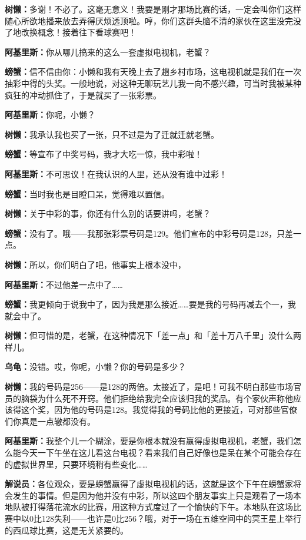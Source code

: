 \documentclass[
  12pt,
  twoside,
  openright,
  oldfontcommands,
]{memoir}
\newcommand{\dialogname}[1]{{\heifamily\bfseries #1}}
\begin{document}
\dialogname{树懒：}多谢！不必了。这毫无意义！我要是刚才那场比赛的话，一定会叫你们这样随心所欲地播来放去弄得厌烦透顶啦。哼，你们这群头脑不清的家伙在这里没完没了地改换概念！接着往下看球赛吧！

\dialogname{阿基里斯：}你从哪儿搞来的这么一套虚拟电视机，老蟹？

\dialogname{螃蟹：}信不信由你：小懒和我有天晚上去了趟乡村市场，这电视机就是我们在一次抽彩中得的头奖。一般地说，对这种无聊玩艺儿我一向不感兴趣，可当时我被某种疯狂的冲动抓住了，于是就买了一张彩票。

\dialogname{阿基里斯：}你呢，小懒？

\dialogname{树懒：}我承认我也买了一张，只不过是为了迁就迁就老蟹。

\dialogname{螃蟹：}等宣布了中奖号码，我才大吃一惊，我中彩啦！

\dialogname{阿基里斯：}不可思议！在我认识的人里，还从没有谁中过彩！

\dialogname{螃蟹：}当时我也是目瞪口呆，觉得难以置信。

\dialogname{树懒：}关于中彩的事，你还有什么别的话要讲吗，老蟹？

\dialogname{螃蟹：}没有了。哦------我那张彩票号码是129。他们宣布的中彩号码是128，只差一点。

\dialogname{树懒：}所以，你们明白了吧，他事实上根本没中，

\dialogname{阿基里斯：}不过他差一点中了\ldots\ldots{}

\dialogname{螃蟹：}我更倾向于说我中了，因为我是那么接近\ldots\ldots 要是我的号码再减去个一，我就会中了。

\dialogname{树懒：}但可惜的是，老蟹，在这种情况下「差一点」和「差十万八千里」没什么两样儿。

\dialogname{乌龟：}没错。哎，你呢，小懒？你的号码是多少？

\dialogname{树懒：}我的号码是256------是128的两倍。太接近了，是吧！可我不明白那些市场官员的脑袋为什么死不开窍。他们拒绝给我完全应该归我的奖品。有个家伙声称他应该得这个奖，因为他的号码是128。我觉得我的号码比他的更接近，可对那些官僚们你真是一点辙都没有。

\dialogname{阿基里斯：}我整个儿一个糊涂，要是你根本就没有赢得虚拟电视机，老蟹，我们怎么能今天一下午坐在这儿看这台电视？看来我们自己好像也是呆在某个可能会存在的虚拟世界里，只要环境稍有些变化\ldots\ldots{}

\dialogname{解说员：}各位观众，要是螃蟹赢得了虚拟电视机的话，这就是这个下午在螃蟹家将会发生的事情。但是因为他并没有中彩，所以这四个朋友事实上只是观看了一场本地队被打得落花流水的比赛，用这种方式度过了一个愉快的下午。本地队在这场比赛中以0比128失利------也许是0比256？哦，对于一场在五维空间中的冥王星上举行的西瓜球比赛，这是无关紧要的。
\end{document}

